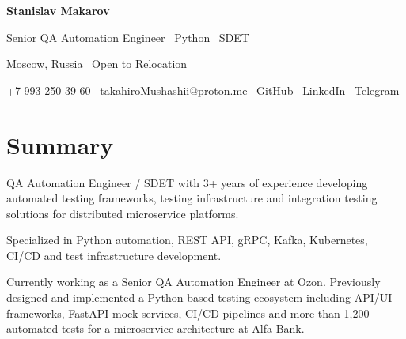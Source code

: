 \documentclass[letterpaper,11pt]{article}
\newcommand{\resumeSubHeadingListStart}{\begin{itemize}[leftmargin=0.15in, label={}]}
\newcommand{\resumeSubHeadingListEnd}{\end{itemize}}
\begin{document}

\begin{center}

{\Huge \textbf{Stanislav Makarov}}

\vspace{4pt}

{\large Senior QA Automation Engineer \textbar\ Python \textbar\ SDET}

\vspace{4pt}

Moscow, Russia \textbullet\ Open to Relocation

\vspace{6pt}

\small
+7 993 250-39-60 \textbar\
\href{mailto:takahiroMushashii@proton.me}{takahiroMushashii@proton.me}
\textbar\
\href{https://github.com/chyioIshi}{GitHub}
\textbar\
\href{https://linkedin.com/in/chyioIshi}{LinkedIn}
\textbar\
\href{https://t.me/makarovsvv}{Telegram}

\end{center}

\section{Summary}
    \resumeSubHeadingListStart
        {QA Automation Engineer / SDET with 3+ years of experience developing automated
        testing frameworks, testing infrastructure and integration testing solutions
        for distributed microservice platforms.
        
        Specialized in Python automation, REST API, gRPC, Kafka, Kubernetes,
        CI/CD and test infrastructure development.
        
        Currently working as a Senior QA Automation Engineer at Ozon.
        Previously designed and implemented a Python-based testing ecosystem
        including API/UI frameworks, FastAPI mock services,
        CI/CD pipelines and more than 1,200 automated tests
        for a microservice architecture at Alfa-Bank.}
    \resumeSubHeadingListEnd
\end{document}
